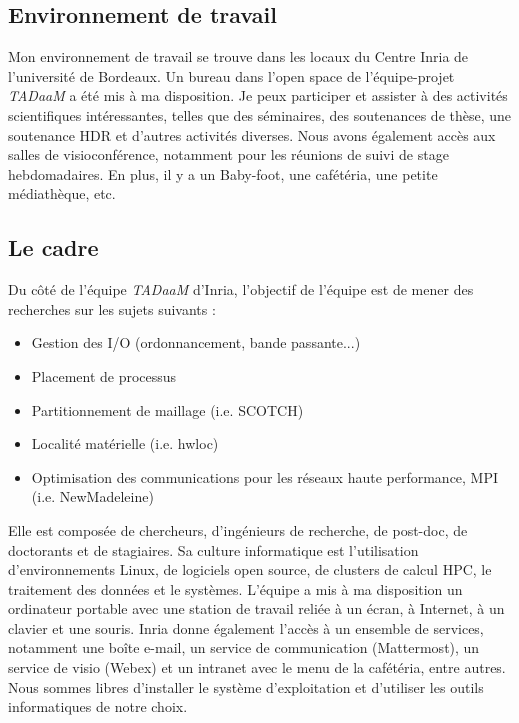 
\subsection{Environnement de travail}

Mon environnement de travail se trouve dans les locaux du Centre Inria de l'université de Bordeaux.
Un bureau dans l'open space de l'équipe-projet \emph{TADaaM} a été mis à ma disposition.
Je peux participer et assister à des activités scientifiques intéressantes, telles que des séminaires, des soutenances de thèse, une soutenance HDR et d'autres activités diverses.
Nous avons également accès aux salles de visioconférence, notamment pour les réunions de suivi de stage hebdomadaires.
En plus, il y a un Baby-foot, une cafétéria, une petite médiathèque, etc.

\subsection{Le cadre}

Du côté de l'équipe \emph{TADaaM} d'Inria, l'objectif de l'équipe est de mener des recherches sur les sujets suivants :

\begin{itemize}
  \item Gestion des I/O (ordonnancement, bande passante...)
  \item Placement de processus
  \item Partitionnement de maillage (i.e. SCOTCH)
  \item Localité matérielle (i.e. hwloc)
  \item Optimisation des communications pour les réseaux haute performance, MPI (i.e. NewMadeleine)
\end{itemize}

Elle est composée de chercheurs, d'ingénieurs de recherche, de post-doc, de doctorants et de stagiaires.
Sa culture informatique est l'utilisation d'environnements Linux, de logiciels open source, de clusters de calcul HPC,
le traitement des données et le systèmes.
L'équipe a mis à ma disposition un ordinateur portable avec une station de travail reliée à un écran, à Internet, à un clavier et une souris.
Inria donne également l'accès à un ensemble de services, notamment une boîte e-mail, un service de communication (Mattermost), un service de visio (Webex) et un intranet avec le menu de la cafétéria, entre autres.
Nous sommes libres d'installer le système d'exploitation et d'utiliser les outils informatiques de notre choix.

